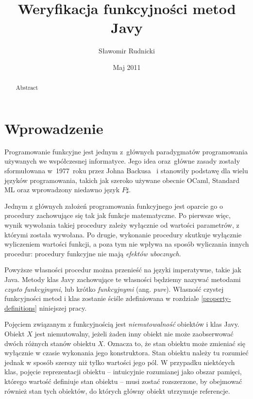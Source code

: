 \documentclass{pracamgr}
\author{Sławomir Rudnicki}
\title{Weryfikacja funkcyjności metod Javy}
\date{Maj 2011}
\begin{document}
\maketitle

\begin{abstract}
  Abstract %
\end{abstract}

\tableofcontents

\chapter*{Wprowadzenie}

Programowanie funkcyjne jest jednym z~głównych paradygmatów
programowania używanych we współczesnej informatyce. Jego idea
oraz~główne zasady zostały sformułowana w~1977~roku przez Johna
Backusa~\cite{backus} i stanowiły podstawę dla wielu języków
programowania, takich jak szeroko używane obecnie OCaml, Standard ML
oraz wprowadzony niedawno język $F\sharp$.

Jednym z głównych założeń programowania funkcyjnego jest oparcie go o
procedury zachowujące się tak jak funkcje matematyczne. Po pierwsze
więc, wynik wywołania takiej procedury zależy wyłącznie od wartości
parametrów, z którymi została wywołana. Po drugie, wykonanie procedury
skutkuje wyłącznie wyliczeniem wartości funkcji, a poza tym nie wpływa
na sposób wyliczania innych procedur: procedury funkcyjne nie mają
\emph{efektów ubocznych}.

Powyższe własności procedur można przenieść na języki imperatywne,
takie jak Java. Metody klas Javy zachowujące te własności będziemy
nazywać metodami \emph{czysto funkcyjnymi}, lub krótko
\emph{funkcyjnymi} (ang. \emph{pure}). Własność czystej
funkcyjności metod i klas zostanie ściśle zdefiniowana w rozdziale
\ref{property-definitions} niniejszej pracy.

Pojęciem związanym z funkcyjnością jest \emph{niemutowalność} obiektów
i klas Javy.  Obiekt $X$ jest niemutowalny, jeżeli żaden inny obiekt
nie może zaobserwować dwóch różnych stanów obiektu $X$. Oznacza to, że
stan obiektu może zmieniać się wyłącznie w czasie wykonania jego
konstruktora. Stan obiektu należy tu rozumieć jednak w sposób szerszy
niż tylko wartości jego pól. W przypadku niektórych klas, pojęcie
reprezentacji obiektu -- intuicyjnie rozumianej jako obszar pamięci,
którego wartość definiuje stan obiektu -- musi zostać rozszerzone, by
obejmować również stan tych obiektów, do których główny obiekt
utrzymuje referencje.
\end{document}

